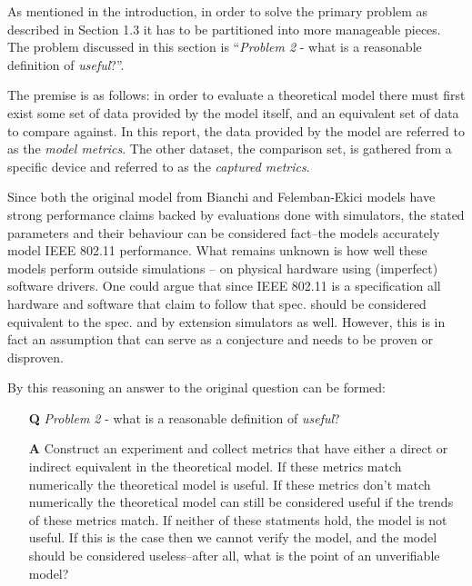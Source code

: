 As mentioned in the introduction, in order to solve the primary problem as
described in Section 1.3 it has to be partitioned into more manageable pieces.
The problem discussed in this section is ``\emph{Problem 2} - what is a
reasonable definition of \emph{useful}?''.

The premise is as follows: in order to evaluate a theoretical model there must
first exist some set of data provided by the model itself, and an equivalent
set of data to compare against. In this report, the data provided by the model
are referred to as the \emph{model metrics}. The other dataset, the comparison
set, is gathered from a specific device and referred to as the \emph{captured
metrics}.

Since both the original model from Bianchi and Felemban-Ekici models have
strong performance claims backed by evaluations done with simulators, the
stated parameters and their behaviour can be considered fact--the models
accurately model IEEE 802.11 performance. What remains unknown is how well
these models perform outside simulations -- on physical hardware using
(imperfect) software drivers. One could argue that since IEEE 802.11 is a
specification all hardware and software that claim to follow that spec. should
be considered equivalent to the spec. and by extension simulators as well.
However, this is in fact an assumption that can serve as a conjecture and
needs to be proven or disproven.

By this reasoning an answer to the original question can be formed:

\begin{itemize}

    \item[\textbf{Q}] \emph{Problem 2} - what is a reasonable definition of \emph{useful}?

    \item[\textbf{A}] Construct an experiment and collect metrics that have
either a direct or indirect equivalent in the theoretical model. If these
metrics match numerically the theoretical model is useful. If these metrics
don't match numerically the theoretical model can still be considered useful
if the trends of these metrics match. If neither of these statments hold, the
model is not useful. If this is the case then we cannot verify the model, and
the model should be considered useless--after all, what is the point of an 
unverifiable model?

\end{itemize}

